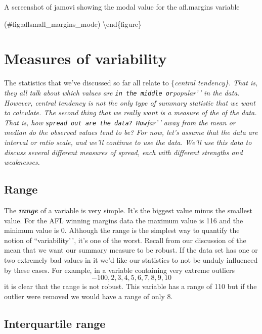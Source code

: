 \documentclass[
]{book}
\begin{document}
\caption{A screenshot of jamovi showing the modal value for the afl.margins variable}

(\#fig:aflsmall\_margins\_mode)
\textbackslash end\{figure\}

\hypertarget{var}{%
\section{Measures of variability}\label{var}}

The statistics that we've discussed so far all relate to \{\it central tendency\}. That is, they all talk about which values are \texttt{in\ the\ middle\textquotesingle{}\textquotesingle{}\ or}popular'\,' in the data. However, central tendency is not the only type of summary statistic that we want to calculate. The second thing that we really want is a measure of the  of the data. That is, how \texttt{spread\ out\textquotesingle{}\textquotesingle{}\ are\ the\ data?\ How}far'\,' away from the mean or median do the observed values tend to be? For now, let's assume that the data are interval or ratio scale, and we'll continue to use the  data. We'll use this data to discuss several different measures of spread, each with different strengths and weaknesses.

\hypertarget{range}{%
\subsection{Range}\label{range}}

The \textbf{\emph{range}} of a variable is very simple. It's the biggest value minus the smallest value. For the AFL winning margins data the maximum value is 116 and the minimum value is 0. Although the range is the simplest way to quantify the notion of ``variability'\,', it's one of the worst. Recall from our discussion of the mean that we want our summary measure to be robust. If the data set has one or two extremely bad values in it we'd like our statistics to not be unduly influenced by these cases. For example, in a variable containing very extreme outliers
\[
-100,2,3,4,5,6,7,8,9,10
\]
it is clear that the range is not robust. This variable has a range of 110 but if the outlier were removed we would have a range of only 8.

\hypertarget{interquartile-range}{%
\subsection{Interquartile range}\label{interquartile-range}}
\end{document}
